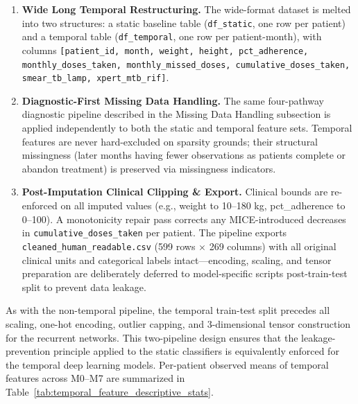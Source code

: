 \documentclass[12pt]{article}
\begin{document}
\begin{enumerate}[noitemsep, topsep=2pt]
  \item \textbf{Wide \textrightarrow{} Long Temporal Restructuring.} The wide-format dataset is melted into two structures: a static baseline table (\texttt{df\_static}, one row per patient) and a temporal table (\texttt{df\_temporal}, one row per patient-month), with columns \texttt{[patient\_id, month, weight, height, pct\_adherence, monthly\_doses\_taken, monthly\_missed\_doses, cumulative\_doses\_taken, smear\_tb\_lamp, xpert\_mtb\_rif]}.
  \item \textbf{Diagnostic-First Missing Data Handling.} The same four-pathway diagnostic pipeline described in the Missing Data Handling subsection is applied independently to both the static and temporal feature sets. Temporal features are never hard-excluded on sparsity grounds; their structural missingness (later months having fewer observations as patients complete or abandon treatment) is preserved via missingness indicators.
  \item \textbf{Post-Imputation Clinical Clipping \& Export.} Clinical bounds are re-enforced on all imputed values (e.g., weight to 10--180 kg, pct\_adherence to 0--100). A monotonicity repair pass corrects any MICE-introduced decreases in \texttt{cumulative\_doses\_taken} per patient. The pipeline exports \texttt{cleaned\_human\_readable.csv} (599 rows $\times$ 269 columns) with all original clinical units and categorical labels intact---encoding, scaling, and tensor preparation are deliberately deferred to model-specific scripts post-train-test split to prevent data leakage.
\end{enumerate}

As with the non-temporal pipeline, the temporal train-test split precedes all scaling, one-hot encoding, outlier capping, and 3-dimensional tensor construction for the recurrent networks. This two-pipeline design ensures that the leakage-prevention principle applied to the static classifiers is equivalently enforced for the temporal deep learning models. Per-patient observed means of temporal features across M0--M7 are summarized in Table~\ref{tab:temporal_feature_descriptive_stats}.
\end{document}
